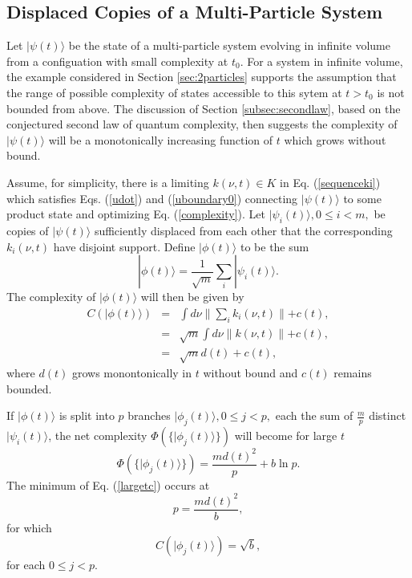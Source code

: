 \documentclass[twocolumn,amsmath,amssymb]{revtex4-1}
\begin{document}
\subsection{\label{subsec:general} Displaced Copies of a Multi-Particle System}

Let $|\psi(t) \rangle $ be the state of a multi-particle system
evolving in infinite volume from a configuation with small complexity at $t_0$.
For a system in infinite volume,
the example considered in Section \ref{sec:2particles} supports
the assumption that the range of
possible complexity of states accessible to this sytem at $t > t_0$
is not bounded from above.
The discussion of Section \ref{subsec:secondlaw},
based on the conjectured second law of quantum complexity, then
suggests the complexity of $|\psi(t) \rangle $ will
be a monotonically increasing function of $t$ which
grows without bound.

Assume, for simplicity, there is a limiting 
$k(\nu, t) \in K$ in Eq. (\ref{sequenceki})
which satisfies
Eqs. (\ref{udot}) and (\ref{uboundary0}) 
connecting
$|\psi(t) \rangle $ to some product state
and optimizing Eq. (\ref{complexity}).
Let
$|\psi_i(t) \rangle , 0 \le i < m,$ be copies of $|\psi(t) \rangle $
sufficiently displaced from each other
that the corresponding $k_i(\nu, t)$ have disjoint
support. Define $|\phi(t) \rangle $ to be the sum
\begin{equation}
  \label{defphit}
  |\phi(t) \rangle  = \frac{1}{\sqrt{m}} \sum_i |\psi_i(t) \rangle .
\end{equation}
The complexity of $|\phi(t) \rangle $ will then be given by
\begin{subequations}
  \begin{eqnarray}
    \label{cphi0}
    C(|\phi(t) \rangle ) & = & \int d \nu \parallel \sum_i k_i( \nu, t) \parallel + c(t), \\
    \label{cphi1}
    & = & \sqrt{m} \int d \nu \parallel k( \nu, t) \parallel + c(t), \\
    \label{cphi2}
    & = & \sqrt{m} d(t) + c(t),
  \end{eqnarray}
\end{subequations}
where $d(t)$ grows monontonically in $t$ without bound and
$c(t)$ remains bounded.

If $|\phi(t) \rangle $ is split into $p$ branches $|\phi_j(t) \rangle , 0 \le j < p,$ each
the sum of $\frac{m}{p}$ distinct $|\psi_i(t) \rangle $, the net complexity
$\Phi( \{ |\phi_j(t) \rangle  \})$ will become for large $t$
\begin{equation}
  \label{largetc}
  \Phi( \{ |\phi_j(t) \rangle  \}) = \frac{m d(t)^2}{p} + b \ln p.
\end{equation}
The minimum of Eq. (\ref{largetc}) occurs at
\begin{equation}
  \label{optlargetc}
  p = \frac{ m d(t)^2}{b},
\end{equation}
for which
\begin{equation}
  \label{optphic}
  C( |\phi_j(t) \rangle ) = \sqrt{b},
\end{equation}
for each $0 \le j < p$.
\end{document}
